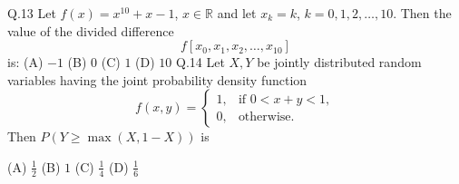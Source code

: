 \documentclass{article}
\begin{document}
																									    Q.13 \quad Let $f(x) = x^{10} + x - 1$, $x \in \mathbb{R}$ and let $x_k = k$, $k=0,1,2,\dots,10$. Then the value of the divided difference
																									    \[
																									    f[x_0, x_1, x_2, \dots, x_{10}]
																									    \]
																									    is:
																									    \newline 
																									    \noindent (A) $-1$ \hspace{2cm} (B) $0$ \hspace{2cm}(C) $1$ \hspace{2cm} (D) $10$
																									    \vspace{1em}
																									    \newline
																									    Q.14 \quad Let $X, Y$ be jointly distributed random variables having the joint probability density function
																									    \[
																									    f(x,y) = \begin{cases}
																									    1, & \text{if } 0 < x + y < 1, \\
																									    0, & \text{otherwise.}
																									    \end{cases}
																									    \]
																									    Then $P(Y \ge \max(X, 1 - X))$ is
																									    \vspace{1em}
																									    \newline

																									    \noindent (A) $\tfrac{1}{2}$ \hspace{2cm} (B) $1$ \hspace{2cm}(C) $\tfrac{1}{4}$ \hspace{2cm} (D) $\tfrac{1}{6}$
																									    \vspace{1em}
\end{document}
